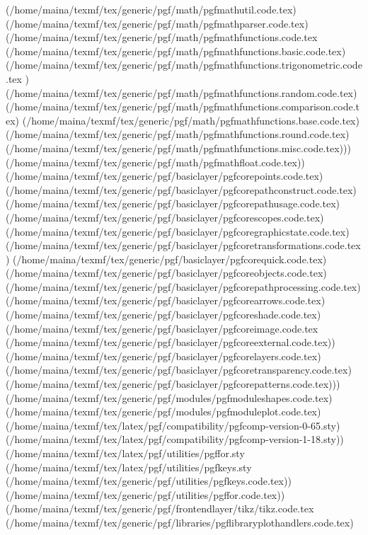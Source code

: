 \begin{center}
\begin{center}
{{(/home/maina/texmf/tex/generic/pgf/math/pgfmathutil.code.tex)
(/home/maina/texmf/tex/generic/pgf/math/pgfmathparser.code.tex)
(/home/maina/texmf/tex/generic/pgf/math/pgfmathfunctions.code.tex
(/home/maina/texmf/tex/generic/pgf/math/pgfmathfunctions.basic.code.tex)
(/home/maina/texmf/tex/generic/pgf/math/pgfmathfunctions.trigonometric.code.tex
) (/home/maina/texmf/tex/generic/pgf/math/pgfmathfunctions.random.code.tex)
(/home/maina/texmf/tex/generic/pgf/math/pgfmathfunctions.comparison.code.tex)
(/home/maina/texmf/tex/generic/pgf/math/pgfmathfunctions.base.code.tex)
(/home/maina/texmf/tex/generic/pgf/math/pgfmathfunctions.round.code.tex)
(/home/maina/texmf/tex/generic/pgf/math/pgfmathfunctions.misc.code.tex)))
(/home/maina/texmf/tex/generic/pgf/math/pgfmathfloat.code.tex))
(/home/maina/texmf/tex/generic/pgf/basiclayer/pgfcorepoints.code.tex)
(/home/maina/texmf/tex/generic/pgf/basiclayer/pgfcorepathconstruct.code.tex)
(/home/maina/texmf/tex/generic/pgf/basiclayer/pgfcorepathusage.code.tex)
(/home/maina/texmf/tex/generic/pgf/basiclayer/pgfcorescopes.code.tex)
(/home/maina/texmf/tex/generic/pgf/basiclayer/pgfcoregraphicstate.code.tex)
(/home/maina/texmf/tex/generic/pgf/basiclayer/pgfcoretransformations.code.tex)
(/home/maina/texmf/tex/generic/pgf/basiclayer/pgfcorequick.code.tex)
(/home/maina/texmf/tex/generic/pgf/basiclayer/pgfcoreobjects.code.tex)
(/home/maina/texmf/tex/generic/pgf/basiclayer/pgfcorepathprocessing.code.tex)
(/home/maina/texmf/tex/generic/pgf/basiclayer/pgfcorearrows.code.tex)
(/home/maina/texmf/tex/generic/pgf/basiclayer/pgfcoreshade.code.tex)
(/home/maina/texmf/tex/generic/pgf/basiclayer/pgfcoreimage.code.tex
(/home/maina/texmf/tex/generic/pgf/basiclayer/pgfcoreexternal.code.tex))
(/home/maina/texmf/tex/generic/pgf/basiclayer/pgfcorelayers.code.tex)
(/home/maina/texmf/tex/generic/pgf/basiclayer/pgfcoretransparency.code.tex)
(/home/maina/texmf/tex/generic/pgf/basiclayer/pgfcorepatterns.code.tex)))
(/home/maina/texmf/tex/generic/pgf/modules/pgfmoduleshapes.code.tex)
(/home/maina/texmf/tex/generic/pgf/modules/pgfmoduleplot.code.tex)
(/home/maina/texmf/tex/latex/pgf/compatibility/pgfcomp-version-0-65.sty)
(/home/maina/texmf/tex/latex/pgf/compatibility/pgfcomp-version-1-18.sty))
(/home/maina/texmf/tex/latex/pgf/utilities/pgffor.sty
(/home/maina/texmf/tex/latex/pgf/utilities/pgfkeys.sty
(/home/maina/texmf/tex/generic/pgf/utilities/pgfkeys.code.tex))
(/home/maina/texmf/tex/generic/pgf/utilities/pgffor.code.tex))
(/home/maina/texmf/tex/generic/pgf/frontendlayer/tikz/tikz.code.tex
(/home/maina/texmf/tex/generic/pgf/libraries/pgflibraryplothandlers.code.tex)
}}
\end{center}
\end{center}
